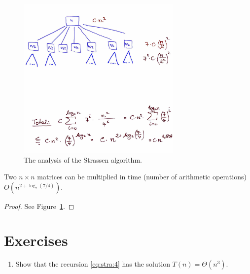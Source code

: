   \begin{figure}
    \centering
     \includegraphics[height=8cm]{figures/Strassen.pdf}
    \caption{The analysis of the Strassen algorithm. }
    \label{fig:str:1}
  \end{figure}


  \begin{theorem}[Strassen]
    \label{thr:10}
    Two $n × n$ matrices can be multiplied in time (number of arithmetic operations) $O(n^{2+ \log_2(7/4)})$. 
  \end{theorem}



  \begin{proof}
    See Figure~\ref{fig:str:1}. 

  \end{proof}

\section*{Exercises}

\begin{enumerate}
\item Show that the recursion \eqref{eq:stra:4} has the solution $T(n) = Θ (n^3)$.  \label{item:str:4}
\end{enumerate}

